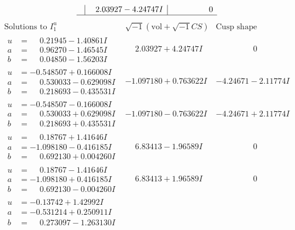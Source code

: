 \documentclass[1p]{elsarticle_modified}
\theoremstyle{definition}
\newcommand{\I}{\sqrt{-1}}
\begin{document}
$$\begin{array}{c|c|c}
 & \phantom{-}2.03927 - 4.24747 I & \phantom{-0.000000 } 0\\
 \hline 
 \end{array}$$\newpage$$\begin{array}{c|c|c}  
\text{Solutions to }I^u_{1}& \I (\text{vol} + \sqrt{-1}CS) & \text{Cusp shape}\\
 \hline 
\begin{aligned}
u &= \phantom{-}0.21945 - 1.40861 I \\
a &= \phantom{-}0.96270 - 1.46545 I \\
b &= \phantom{-}0.04850 - 1.56203 I\end{aligned}
 & \phantom{-}2.03927 + 4.24747 I & \phantom{-0.000000 } 0 \\ \hline\begin{aligned}
u &= -0.548507 + 0.166008 I \\
a &= \phantom{-}0.530033 - 0.629098 I \\
b &= \phantom{-}0.218693 - 0.435531 I\end{aligned}
 & -1.097180 + 0.763622 I & -4.24671 - 2.11774 I \\ \hline\begin{aligned}
u &= -0.548507 - 0.166008 I \\
a &= \phantom{-}0.530033 + 0.629098 I \\
b &= \phantom{-}0.218693 + 0.435531 I\end{aligned}
 & -1.097180 - 0.763622 I & -4.24671 + 2.11774 I \\ \hline\begin{aligned}
u &= \phantom{-}0.18767 + 1.41646 I \\
a &= -1.098180 - 0.416185 I \\
b &= \phantom{-}0.692130 + 0.004260 I\end{aligned}
 & \phantom{-}6.83413 - 1.96589 I & \phantom{-0.000000 } 0 \\ \hline\begin{aligned}
u &= \phantom{-}0.18767 - 1.41646 I \\
a &= -1.098180 + 0.416185 I \\
b &= \phantom{-}0.692130 - 0.004260 I\end{aligned}
 & \phantom{-}6.83413 + 1.96589 I & \phantom{-0.000000 } 0 \\ \hline\begin{aligned}
u &= -0.13742 + 1.42992 I \\
a &= -0.531214 + 0.250911 I \\
b &= \phantom{-}0.273097 - 1.263130 I\end{aligned}

\end{array}$$
\end{document}
